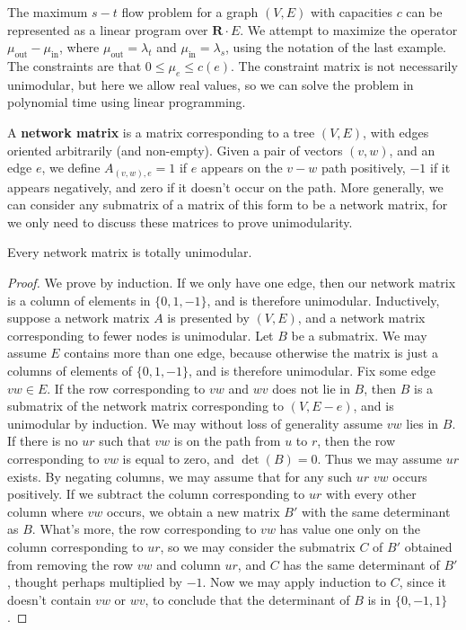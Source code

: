 \begin{example}
    The maximum $s-t$ flow problem for a graph $(V,E)$ with capacities $c$ can be represented as a linear program over $\mathbf{R} \cdot E$. We attempt to maximize the operator $\mu_{\text{out}} - \mu_{\text{in}}$, where $\mu_{\text{out}} = \lambda_t$ and $\mu_{\text{in}} = \lambda_s$, using the notation of the last example. The constraints are that $0 \leq \mu_e \leq c(e)$. The constraint matrix is not necessarily unimodular, but here we allow real values, so we can solve the problem in polynomial time using linear programming.
\end{example}

A {\bf network matrix} is a matrix corresponding to a tree $(V,E)$, with edges oriented arbitrarily (and non-empty). Given a pair of vectors $(v,w)$, and an edge $e$, we define $A_{(v,w),e} = 1$ if $e$ appears on the $v-w$ path positively, $-1$ if it appears negatively, and zero if it doesn't occur on the path. More generally, we can consider any submatrix of a matrix of this form to be a network matrix, for we only need to discuss these matrices to prove unimodularity.

\begin{theorem}
    Every network matrix is totally unimodular.
\end{theorem}
\begin{proof}
    We prove by induction. If we only have one edge, then our network matrix is a column of elements in $\{ 0, 1, -1 \}$, and is therefore unimodular. Inductively, suppose a network matrix $A$ is presented by $(V,E)$, and a network matrix corresponding to fewer nodes is unimodular. Let $B$ be a submatrix. We may assume $E$ contains more than one edge, because otherwise the matrix is just a columns of elements of $\{ 0, 1, -1 \}$, and is therefore unimodular. Fix some edge $vw \in E$. If the row corresponding to $vw$ and $wv$ does not lie in $B$, then $B$ is a submatrix of the network matrix corresponding to $(V,E-e)$, and is unimodular by induction. We may without loss of generality assume $vw$ lies in $B$. If there is no $ur$ such that $vw$ is on the path from $u$ to $r$, then the row corresponding to $vw$ is equal to zero, and $\det(B) = 0$. Thus we may assume $ur$ exists. By negating columns, we may assume that for any such $ur$ $vw$ occurs positively. If we subtract the column corresponding to $ur$ with every other column where $vw$ occurs, we obtain a new matrix $B'$ with the same determinant as $B$. What's more, the row corresponding to $vw$ has value one only on the column corresponding to $ur$, so we may consider the submatrix $C$ of $B'$ obtained from removing the row $vw$ and column $ur$, and $C$ has the same determinant of $B'$, thought perhaps multiplied by $-1$. Now we may apply induction to $C$, since it doesn't contain $vw$ or $wv$, to conclude that the determinant of $B$ is in $\{ 0, -1, 1 \}$.
\end{proof}

